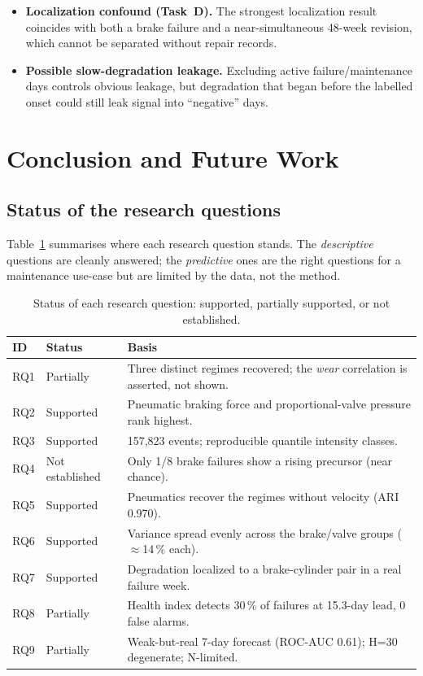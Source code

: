 \documentclass[11pt,a4paper]{article}
\begin{document}
\begin{itemize}[leftmargin=1.4em,itemsep=0.2em]
and compressor failures are pooled, capping achievable precision, and the H=7 out-of-sample
recall (5/12) is the only metric to read semi-seriously.
\item \textbf{Localization confound (Task~D).} The strongest localization result coincides
with both a brake failure and a near-simultaneous 48-week revision, which cannot be
separated without repair records.
\item \textbf{Possible slow-degradation leakage.} Excluding active failure/maintenance days
controls obvious leakage, but degradation that began before the labelled onset could still
leak signal into ``negative'' days.
\end{itemize}

\setcounter{section}{9}
\section{Conclusion and Future Work}
\label{sec:conclusion}

\subsection{Status of the research questions}
Table~\ref{tab:status} summarises where each research question stands. The
\emph{descriptive} questions are cleanly answered; the \emph{predictive} ones are the right
questions for a maintenance use-case but are limited by the data, not the method.

\begin{table}[H]
\centering
\caption{Status of each research question: supported, partially supported, or not
established.}
\label{tab:status}
\small
\begin{tabular}{l l p{8.6cm}}
\toprule
ID & Status & Basis\\
\midrule
RQ1 & Partially & Three distinct regimes recovered; the \emph{wear} correlation is asserted, not shown.\\
RQ2 & Supported & Pneumatic braking force and proportional-valve pressure rank highest.\\
RQ3 & Supported & 157{,}823 events; reproducible quantile intensity classes.\\
RQ4 & Not established & Only 1/8 brake failures show a rising precursor (near chance).\\
RQ5 & Supported & Pneumatics recover the regimes without velocity (ARI 0.970).\\
RQ6 & Supported & Variance spread evenly across the brake/valve groups ($\approx$14\,\% each).\\
RQ7 & Supported & Degradation localized to a brake-cylinder pair in a real failure week.\\
RQ8 & Partially & Health index detects 30\,\% of failures at 15.3-day lead, 0 false alarms.\\
RQ9 & Partially & Weak-but-real 7-day forecast (ROC-AUC 0.61); H=30 degenerate; N-limited.\\
\bottomrule
\end{tabular}
\end{table}
\end{document}
